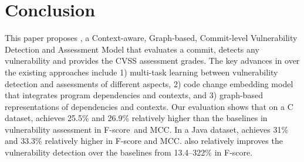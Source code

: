 \section{Conclusion}

This paper proposes {\tool}, a Context-aware, Graph-based,
Commit-level Vulnerability Detection and Assessment Model that
evaluates a commit, detects any vulnerability and provides the CVSS
assessment grades.
The key advances in {\tool} over the existing approaches include 1)
multi-task learning between vulnerability detection and assessments of
different aspects, 2) code change embedding model that integrates
program dependencies and contexts, and 3) graph-based representations
of dependencies and contexts. Our evaluation shows that on a
C dataset, {\tool} achieves 25.5\% and 26.9\%
relatively higher than the baselines in vulnerability assessment in
F-score~and MCC. In a Java dataset, {\tool} achieves
31\% and 33.3\% relatively higher in F-score and MCC. {\tool} also
relatively improves the vulnerability detection over the baselines
from 13.4–322\% in F-score.



















